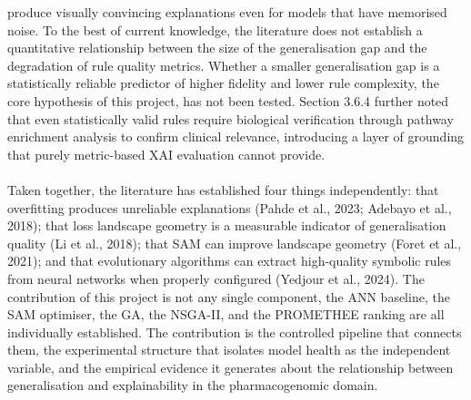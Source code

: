 produce visually convincing explanations even for models that have memorised noise. To the best of current 
knowledge, the literature does not establish a quantitative relationship between the size of the generalisation 
gap and the degradation of rule quality metrics. Whether a smaller generalisation gap is a statistically 
reliable predictor of higher fidelity and lower rule complexity, the core hypothesis of this project, 
has not been tested. Section 3.6.4 further noted that even statistically valid rules require biological 
verification through pathway enrichment analysis to confirm clinical relevance, introducing a layer of 
grounding that purely metric-based XAI evaluation cannot provide.
\\\\
Taken together, the literature has established four things independently: that overfitting produces unreliable 
explanations (Pahde et al., 2023; Adebayo et al., 2018); that loss landscape geometry is a measurable indicator 
of generalisation quality (Li et al., 2018); that SAM can improve landscape geometry (Foret et al., 2021); and 
that evolutionary algorithms can extract high-quality symbolic rules from neural networks when properly 
configured (Yedjour et al., 2024). The contribution of this project is not any single component, the 
ANN baseline, the SAM optimiser, the GA, the NSGA-II, and the PROMETHEE ranking are all individually 
established. The contribution is the controlled pipeline that connects them, the experimental structure that 
isolates model health as the independent variable, and the empirical evidence it generates about the 
relationship between generalisation and explainability in the pharmacogenomic domain.
\\\\
